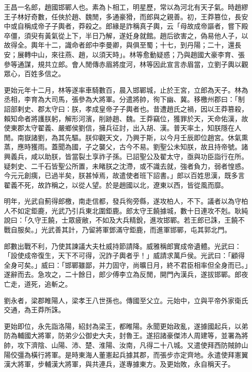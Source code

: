 
\begin{pinyinscope}
王昌一名郎，趙國邯鄲人也。素為卜相工，明星歷，常以為河北有天子氣。時趙繆王子林好奇數，任俠於趙、魏閒，多通豪猾，而郎與之親善。初，王莽篡位，長安中或自稱成帝子子輿者，莽殺之。郎緣是詐稱真子輿，云「母故成帝謳者，嘗下殿卒僵，須臾有黃氣從上下，半日乃解，遂妊身就館。趙后欲害之，偽易他人子，以故得全。輿年十二，識命者郎中李曼卿，與俱至蜀；十七，到丹陽；二十，還長安；展轉中山，來往燕、趙，以須天時」。林等愈動疑惑；乃與趙國大豪李育、張參等通謀，規共立郎。會人閒傳赤眉將度河，林等因此宣言赤眉當，立劉子輿以觀眾心，百姓多信之。

更始元年十二月，林等遂率車騎數百，晨入邯鄲城，止於王宮，立郎為天子。林為丞相，李育為大司馬，張參為大將軍。分遣將帥，徇下幽、冀。移檄州郡曰：「制詔部剌史、郡太守曰：朕，孝成皇帝子子輿者也。昔遭趙氏之禍，因以王莽篡殺，賴知命者將護朕躬，解形河濱，削跡趙、魏。王莽竊位，獲罪於天，天命佑漢，故使東郡太守翟義、嚴鄉侯劉信，擁兵征討，出入胡、漢。普天率土，知朕隱在人閒。南嶽諸劉，為其先驅。朕仰觀天文，乃興于斯，以今月壬辰即位趙宮。休氣熏蒸，應時獲雨。蓋聞為國，子之襲父，古今不易。劉聖公未知朕，故且持帝號。諸興義兵，咸以助朕，皆當裂土享祚子孫。已詔聖公及翟太守，亟與功臣詣行在所。疑刺史、二千石皆聖公所置，未睹朕之沈滯，或不識去就，強者負力，弱者惶惑。今元元創痍，已過半矣，朕甚悼焉，故遣使者班下詔書。」郎以百姓思漢，既多言翟義不死，故詐稱之，以從人望。於是趙國以北，遼東以西，皆從風而靡。

明年，光武自薊得郎檄，南走信都，發兵徇旁縣，遂攻柏人，不下。議者以為守柏人不如定鉅鹿，光武乃引兵東北圍鉅鹿。郎太守王饒據城，數十日連攻不剋。耿純說曰：「久守王饒，士眾疲敝，不如及大兵精銳，進攻邯鄲。若王郎已誅，王饒不戰自服矣。」光武善其計，乃留將軍鄧滿守鉅鹿，而進軍邯鄲，屯其郭北門。

郎數出戰不利，乃使其諫議大夫杜威持節請降。威雅稱郎實成帝遺體。光武曰：「設使成帝復生，天下不可得，況詐子輿者乎！」威請求萬戶侯。光武曰：「顧得全身可矣。」威曰：「邯鄲雖鄙，并力固守，尚曠日月，終不君臣相率但全身而已。」遂辭而去。急攻之，二十餘日，郎少傅李立為反閒，開門內漢兵，遂拔邯鄲。郎夜亡走，道死，追斬之。

劉永者，梁郡睢陽人，梁孝王八世孫也。傳國至父立。元始中，立與平帝外家衛氏交通，為王莽所誅。

更始即位，永先詣洛陽，紹封為梁王，都睢陽。永聞更始政亂，遂據國起兵，以弟防為輔國大將軍，防弟少公御史大夫，封魯王。遂招諸豪傑沛人周建等，並署為將帥，攻下濟陰、山陽、沛、楚、淮陽、汝南，凡得二十八城。又遣使拜西防賊帥山陽佼彊為橫行將軍。是時東海人董憲起兵據其郡，而張步亦定齊地。永遣使拜憲翼漢大將軍，步輔漢大將軍，與共連兵，遂專據東方。及更始敗，永自稱天子。


\end{pinyinscope}
